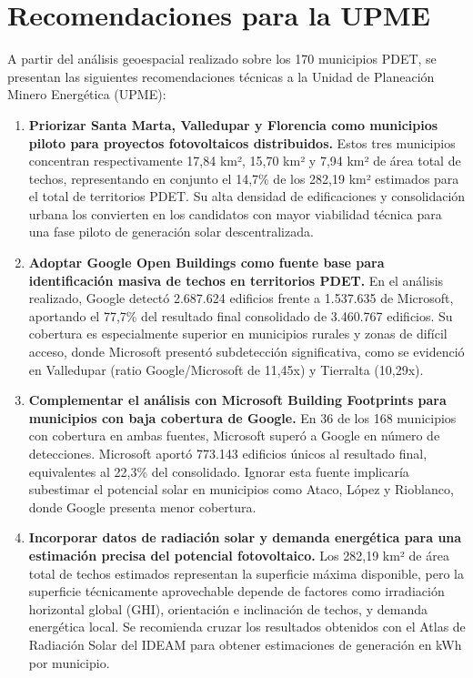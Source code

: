 \documentclass{article}
\begin{document}
\section{Recomendaciones para la UPME}

A partir del análisis geoespacial realizado sobre los 170 municipios PDET, 
se presentan las siguientes recomendaciones técnicas a la Unidad de 
Planeación Minero Energética (UPME):

\begin{enumerate}

    \item \textbf{Priorizar Santa Marta, Valledupar y Florencia como municipios 
    piloto para proyectos fotovoltaicos distribuidos.} Estos tres municipios 
    concentran respectivamente 17,84 km², 15,70 km² y 7,94 km² de área total 
    de techos, representando en conjunto el 14,7\% de los 282,19 km² estimados 
    para el total de territorios PDET. Su alta densidad de edificaciones y 
    consolidación urbana los convierten en los candidatos con mayor viabilidad 
    técnica para una fase piloto de generación solar descentralizada.

    \item \textbf{Adoptar Google Open Buildings como fuente base para 
    identificación masiva de techos en territorios PDET.} En el análisis 
    realizado, Google detectó 2.687.624 edificios frente a 1.537.635 de 
    Microsoft, aportando el 77,7\% del resultado final consolidado de 
    3.460.767 edificios. Su cobertura es especialmente superior en municipios 
    rurales y zonas de difícil acceso, donde Microsoft presentó subdetección 
    significativa, como se evidenció en Valledupar (ratio Google/Microsoft 
    de 11,45x) y Tierralta (10,29x).

    \item \textbf{Complementar el análisis con Microsoft Building Footprints 
    para municipios con baja cobertura de Google.} En 36 de los 168 municipios 
    con cobertura en ambas fuentes, Microsoft superó a Google en número de 
    detecciones. Microsoft aportó 773.143 edificios únicos al resultado final, 
    equivalentes al 22,3\% del consolidado. Ignorar esta fuente implicaría 
    subestimar el potencial solar en municipios como Ataco, López y Rioblanco, 
    donde Google presenta menor cobertura.

    \item \textbf{Incorporar datos de radiación solar y demanda energética 
    para una estimación precisa del potencial fotovoltaico.} Los 282,19 km² 
    de área total de techos estimados representan la superficie máxima 
    disponible, pero la superficie técnicamente aprovechable depende de 
    factores como irradiación horizontal global (GHI), orientación e 
    inclinación de techos, y demanda energética local. Se recomienda cruzar 
    los resultados obtenidos con el Atlas de Radiación Solar del IDEAM para 
    obtener estimaciones de generación en kWh por municipio.


\end{enumerate}
\end{document}
